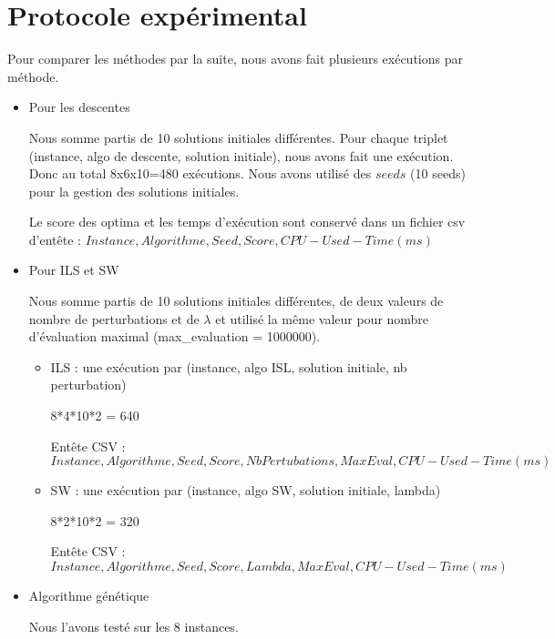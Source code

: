 \section{Protocole expérimental}

Pour comparer les méthodes par la suite, nous avons fait plusieurs exécutions
par méthode. 

\begin{itemize}
	\item Pour les descentes
	
	Nous somme partis de 10 solutions initiales différentes. Pour chaque triplet (instance, algo de descente, solution initiale), nous avons fait une exécution. Donc au total 8x6x10=480 exécutions.  Nous avons utilisé des $seeds$ (10 seeds) pour la gestion des solutions initiales. 
	
	Le score des optima et les temps d'exécution sont conservé dans un fichier csv d'entête : 
	$Instance,Algorithme,Seed,Score,CPU-Used-Time (ms)$
	
	\item Pour ILS et SW
	
	Nous somme partis de 10 solutions initiales différentes, de deux valeurs de nombre de perturbations et de $\lambda$ et utilisé la même valeur pour nombre d’évaluation maximal (max\_evaluation = 1000000).
	
	\begin{itemize}
		\item ILS : une exécution par (instance, algo ISL, solution initiale, nb perturbation)
		
		8*4*10*2 = 640
		
		Entête CSV : $Instance,Algorithme,Seed,Score,NbPertubations,MaxEval,CPU-Used-Time (ms)$
		
		\item SW : une exécution par (instance, algo SW, solution initiale, lambda)
		
		8*2*10*2 = 320
		
		
		Entête CSV : $Instance,Algorithme,Seed,Score,Lambda,MaxEval,CPU-Used-Time (ms)$
	\end{itemize}

	\item Algorithme génétique 
	
	Nous l'avons testé sur les 8 instances.
	
\end{itemize}

